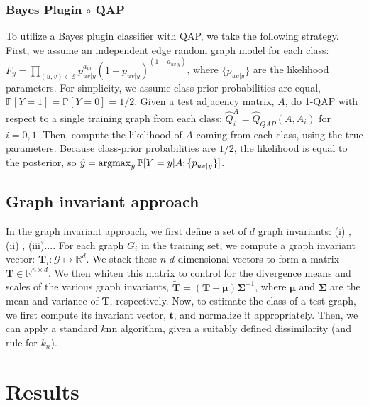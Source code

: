 \documentclass{article} %
\newcommand{\argmax}{\operatornamewithlimits{argmax}}
\newcommand{\PP}{\mathbb{P}}           %
\providecommand{\mc}[1]{\mathcal{#1}}
\providecommand{\mb}[1]{\boldsymbol{#1}}
\providecommand{\mh}[1]{\hat{#1}}
\providecommand{\mtb}[1]{\widetilde{\boldsymbol{#1}}}
\newcommand{\Real}{\mathbb{R}}
\begin{document}


\subsubsection{Bayes Plugin $\circ$ QAP} %
\label{ssub:bayes_plugin_circ_qap}


To utilize a Bayes plugin classifier with QAP, we take the following strategy.  First, we assume an independent edge random graph model for each class: $F_y=\prod_{(u,v) \in \mc{E}}p_{uv|y}^{a_{uv}} (1-p_{uv|y})^{(1-a_{uv|y})}$, where $\{p_{uv|y}\}$ are the likelihood parameters.  For simplicity, we assume class prior probabilities are equal, $\PP[Y=1]=\PP[Y=0]=1/2$.  Given a test adjacency matrix, $A$,  do 1-QAP with respect to a single training graph from each class: $\mh{Q}_i^A=\mh{Q}_{QAP}(A,A_i)$ for $i=0,1$.  Then, compute the likelihood of $A$ coming from each class, using the true parameters.  Because class-prior probabilities are $1/2$, the likelihood is equal to the posterior, so $\mh{y}=\argmax_y \PP[Y=y | A; \{p_{uv|y}\}]$.



\subsection{Graph invariant approach} %
\label{sub:graph_invariant_approach}

In the graph invariant approach, we first define a set of $d$ graph invariants: (i) , (ii) , (iii)....  For each graph $G_i$ in the training set, we compute a graph invariant vector: $\mb{T}_i: \mc{G} \mapsto \Real^d$.  We stack these $n$ $d$-dimensional vectors to form a matrix $\mb{T} \in \Real^{n \times d}$. We then whiten this matrix to control for the divergence means and scales of the various graph invariants, $\mtb{T}=(\mb{T}-\mb{\mu}) \mb{\Sigma}^{-1}$, where $\mb{\mu}$ and $\mb{\Sigma}$ are the mean and variance of $\mb{T}$, respectively.  Now, to estimate the class of a test graph, we first compute its invariant vector, $\mb{t}$, and normalize it appropriately.  Then, we can apply a standard $k$nn algorithm, given a suitably defined dissimilarity (and rule for $k_n$).





\section{Results}
\end{document}
